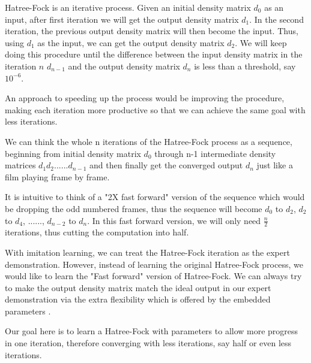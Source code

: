 \documentclass[twoside]{article}
\begin{document}




Hatree-Fock is an iterative process. Given an initial density matrix $d_0$ as an input, after first iteration we will get the output density matrix $d_1$. In the second iteration, the previous output density matrix will then become the input. Thus, using $d_1$ as the input, we can get the output density matrix $d_2$. We will keep doing this procedure until the difference between the input density matrix in the iteration $n$ $d_{n-1}$  and the output density matrix $d_n$ is less than a threshold, say $10^{-6}$. 

An approach to speeding up the process would be improving the procedure, making each iteration more productive so that we can achieve the same goal with less iterations. 

We can think the whole n iterations of the Hatree-Fock process as a sequence, beginning from initial density matrix $d_0$ through n-1 intermediate density matrices $d_1 d_2 ...... d_{n-1}$ and then finally get the converged output $d_{n}$ just like a film playing frame by frame. 

It is intuitive to think of a "2X fast forward" version of the sequence which would be dropping the odd numbered frames, thus the sequence will become $d_0$ to $d_2$, $d_2$ to $d_4$, ......, $d_{n-2}$ to $d_n$. In this fast forward version, we will only need $\frac{n}{2}$ iterations, thus cutting the computation into half.

With imitation learning,
we can treat the Hatree-Fock iteration as the expert demonstration. However, instead of learning the original Hatree-Fock process, we would like to learn the "Fast forward" version of Hatree-Fock. We can always try to make the output density matrix match the ideal output in our expert demonstration via the extra flexibility which is offered by the embedded parameters .


Our goal here is to learn a Hatree-Fock with parameters to allow more progress in one iteration, therefore converging with less iterations, say half or even less iterations.  
\end{document}
